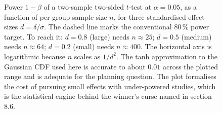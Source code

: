 \begin{figure}[ht]
\begin{tikzpicture}[x=1cm, y=1cm, font=\small]
\end{tikzpicture}
\caption[Power curves for a two-sample $t$-test]{Power $1 - \beta$
of a two-sample two-sided $t$-test at $\alpha = 0.05$, as a function
of per-group sample size $n$, for three standardised effect sizes
$d = \delta/\sigma$. The dashed line marks the conventional
$80\,\%$ power target. To reach it: $d = 0.8$ (large) needs $n
\approx 25$; $d = 0.5$ (medium) needs $n \approx 64$; $d = 0.2$
(small) needs $n \approx 400$. The horizontal axis is logarithmic
because $n$ scales as $1/d^{2}$. The tanh approximation to the
Gaussian CDF used here is accurate to about $0.01$ across the
plotted range and is adequate for the planning question. The plot
formalises the cost of pursuing small effects with under-powered
studies, which is the statistical engine behind the winner's curse
named in section 8.6.}
\label{fig:vol01:ch08:power-curve}
\end{figure}
